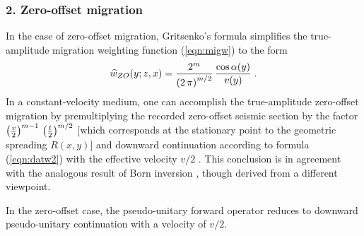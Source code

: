 \subsubsection{2. Zero-offset migration}
In the case of zero-offset mi\-gra\-tion, Grit\-senko's for\-mu\-la
sim\-pli\-fies the true-amp\-li\-tude mi\-gra\-tion weighting function
(\ref{eqn:migw}) to the form
\begin{equation}
\widehat{w}_{ZO}(y;z,x)  =  {{2^m}\over{\left(2\,\pi\right)^{m/2}}} \,
{{\cos{\alpha(y)}} \over {v(y)}}\;.
\label{eqn:zomigw}
\end{equation}
In a constant-velocity medium, one can accomplish the true-amplitude
zero-offset migration by premultiplying the recorded zero-offset
seismic section by the factor $\left(v \over 2 \right)^{m-1}\,\left(t
\over 2\right)^{m/2}$ [which corresponds at the stationary point to the
geometric spreading $R(x,y)$] and downward continuation according to
formula (\ref{eqn:datw2}) with the effective velocity $v/2$ 
\cite[]{goldin87,GEO56-01-00180026}. This conclusion is in
agreement with the analogous result of Born inversion
\cite[]{GEO50-08-12531265}, though derived from a different viewpoint. 

In the zero-offset case, the pseudo-unitary forward operator reduces to
downward pseudo-unitary continuation with a velocity of $v/2$.

